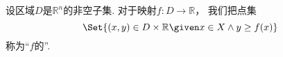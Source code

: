 \begin{definition}
设区域\(D\)是\(\mathbb{R}^n\)的非空子集.
对于映射\(f\colon D \to \mathbb{R}\)，
我们把点集\begin{equation*}
	\Set{
		(x,y) \in D\times\mathbb{R}
		\given
		x \in X
		\land
		y \geq f(x)
	}
\end{equation*}
称为“\(f\)的”.
\end{definition}
